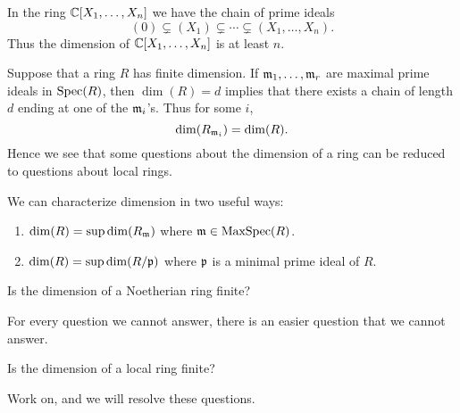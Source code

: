 \documentclass{ximera}
\begin{document}
\begin{example}
  In the ring $\mathbb C[X_1,\dots,X_n]$ we have the chain of prime ideals
  \[
  (0) \subsetneq (X_1) \subsetneq \cdots \subsetneq (X_1,\dots,X_n).
  \]
  Thus the dimension of $\mathbb C[X_1,\dots,X_n]$ is at least $n$.
\end{example}


Suppose that a ring $R$ has finite dimension. If $\mathfrak{m}_1, \dots, \mathfrak{m}_r$
are maximal prime ideals in $\operatorname{Spec}(R)$, then $\dim(R) = d$ implies
that there exists a chain of length $d$ ending at one of the $\mathfrak{m}_i$'s.
Thus for some $i$,
\[
\dim(R_{\mathfrak{m}_i}) = \dim(R). 
\]
Hence we see that some questions about the dimension of a ring can be
reduced to questions about local rings.


\begin{remark}
  We can characterize dimension in two useful ways:
  \begin{enumerate}
  \item $\dim(R) = \sup \dim(R_{\mathfrak{m}})$ where $\mathfrak{m} \in \operatorname{MaxSpec}(R)$.
  \item $\dim(R) = \sup \dim(R/\mathfrak{p})$ where $\mathfrak{p}$ is a minimal prime ideal of $R$. 
  \end{enumerate}
\end{remark}


\begin{question}
  Is the dimension of a Noetherian ring finite?
\end{question}

For every question we cannot answer, there is an easier question that we cannot answer.

\begin{question}
  Is the dimension of a local ring finite?
\end{question}

Work on, and we will resolve these questions.
\end{document}
